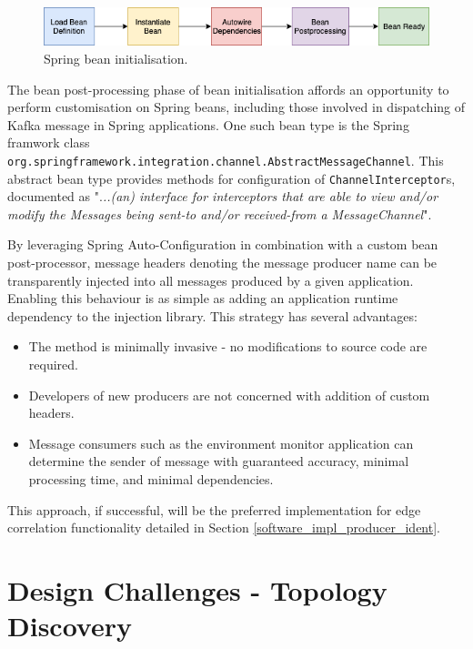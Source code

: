 \vspace{5mm}

\begin{figure}[H]
	\centering  
	\includegraphics[scale=0.6]{figures/design/beanpostprocessor.png}
	\caption{Spring bean initialisation.}
	\label{spring_bean_lifecycle}
\end{figure}

The bean post-processing phase of bean initialisation affords an opportunity to perform customisation on Spring beans, including those involved in dispatching of Kafka message in Spring applications. One such bean type is the Spring framwork class \texttt{org.springframework.integration.channel.AbstractMessageChannel}. This abstract bean type provides methods for configuration of \texttt{ChannelInterceptor}s, documented as ".\textit{..(an) interface for interceptors that are able to view and/or modify the Messages being sent-to and/or received-from a MessageChannel}"\cite{ChannelInterceptor}.

By leveraging Spring Auto-Configuration\cite{SpringFactories} in combination with a custom bean post-processor, message headers denoting the message producer name can be transparently injected into all messages produced by a given application. Enabling this behaviour is as simple as adding an application runtime dependency to the injection library. This strategy has several advantages:

\begin{itemize}
	\item The method is minimally invasive - no modifications to source code are required.
	\item Developers of new producers are not concerned with addition of custom headers.
	\item Message consumers such as the environment monitor application can determine the sender of message with guaranteed accuracy, minimal processing time, and minimal dependencies.
\end{itemize}

This approach, if successful, will be the preferred implementation for edge correlation functionality detailed in Section \ref{software_impl_producer_ident}.

\section{Design Challenges - Topology Discovery} \label{design_topology_discovery}

